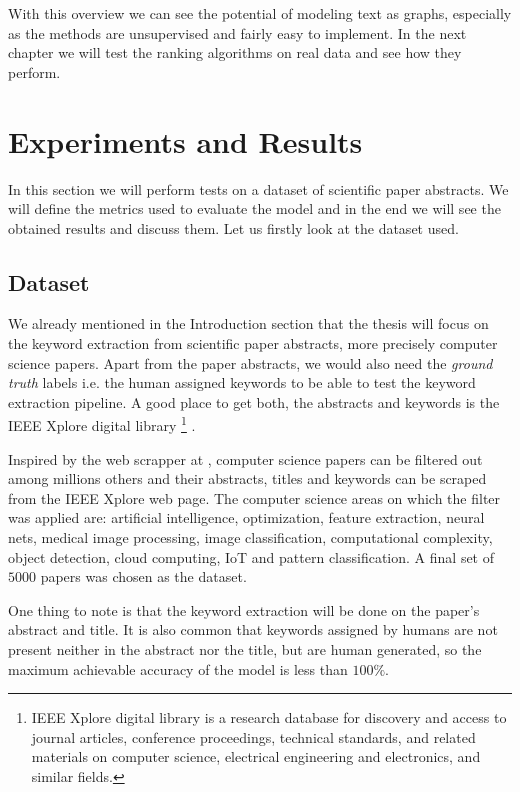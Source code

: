 \documentclass[12pt]{article}
\numberwithin{equation}{section}
\begin{document}
\begin{spacing}{1.5}
	With this overview we can see the potential of modeling text as graphs, especially as the methods are unsupervised and fairly easy to implement. In the next chapter we will test the ranking algorithms on real data and see how they perform.
	
	\newpage
	\section{Experiments and Results}
	In this section we will perform tests on a dataset of scientific paper abstracts. We will define the metrics used to evaluate the model and in the end we will see the obtained results and discuss them. Let us firstly look at the dataset used.
	
	\subsection{Dataset}
	We already mentioned in the Introduction section that the thesis will focus on the keyword extraction from scientific paper abstracts, more precisely computer science papers. Apart from the paper abstracts, we would also need the \textit{ground truth} labels i.e. the human assigned keywords to be able to test the keyword extraction pipeline. A good place to get both, the abstracts and keywords is the IEEE Xplore digital library \footnote{IEEE Xplore digital library is a research database for discovery and access to journal articles, conference proceedings, technical standards, and related materials on computer science, electrical engineering and electronics, and similar fields.} \cite{ieeexplore}. 
	
	Inspired by the web scrapper at \cite{scrapper}, computer science papers can be filtered out among millions others and their abstracts, titles and keywords can be scraped from the IEEE Xplore web page. The computer science areas on which the filter was applied are: artificial intelligence, optimization, feature extraction, neural nets, medical image processing, image classification, computational complexity, object detection, cloud computing, IoT and pattern classification. A final set of $5000$ papers was chosen as the dataset. 
	
	One thing to note is that the keyword extraction will be done on the paper's abstract and title. It is also common that keywords assigned by humans are not present neither in the abstract nor the title, but are human generated, so the maximum achievable accuracy of the model is less than $100 \%$.
	

\end{spacing}
\end{document}
